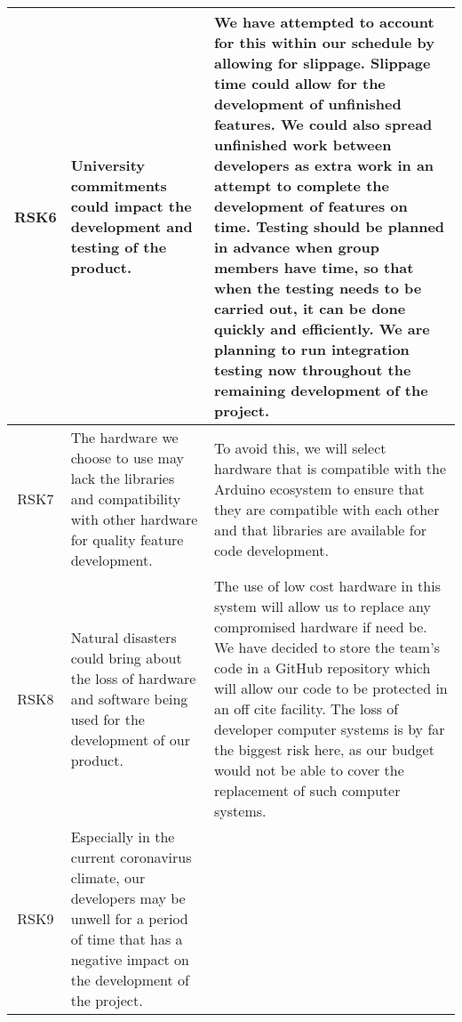 \begin{xltabular}[H]{\textwidth}{c | X | X}
    RSK6

    &

    University commitments could impact the development and testing of the product.

    &

    We have attempted to account for this within our schedule by allowing for slippage. Slippage time could allow for the development of unfinished features. We could also spread unfinished work between developers as extra work in an attempt to complete the development of features on time. \textbf{Testing should be planned in advance when group members have time, so that when the testing needs to be carried out, it can be done quickly and efficiently. We are planning to run integration testing now throughout the remaining development of the project.}\\

    \midrule

    RSK7

    &

    The hardware we choose to use may lack the libraries and compatibility with other hardware for quality feature development.

    &

    To avoid this, we will select hardware that is compatible with the Arduino ecosystem to ensure that they are compatible with each other and that libraries are available for code development.\\

    \midrule

    RSK8

    &

    Natural disasters could bring about the loss of hardware and software being used for the development of our product.

    &

    The use of low cost hardware in this system will allow us to replace any compromised hardware if need be. We have decided to store the team's code in a GitHub repository which will allow our code to be protected in an off cite facility. The loss of developer computer systems is by far the biggest risk here, as our budget would not be able to cover the replacement of such computer systems.\\

    \midrule

    RSK9

    &

    Especially in the current coronavirus climate, our developers may be unwell for a period of time that has a negative impact on the development of the project.


\end{xltabular}
